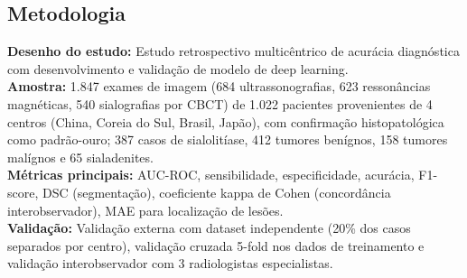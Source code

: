 \subsection{Metodologia}
\textbf{Desenho do estudo:} Estudo retrospectivo multicêntrico de acurácia
diagnóstica com desenvolvimento e validação de modelo de deep learning. \\
\textbf{Amostra:} 1.847 exames de imagem (684 ultrassonografias, 623
ressonâncias magnéticas, 540 sialografias por CBCT) de 1.022 pacientes
provenientes de 4 centros (China, Coreia do Sul, Brasil, Japão), com
confirmação histopatológica como padrão-ouro; 387 casos de sialolitíase,
412 tumores benígnos, 158 tumores malígnos e 65 sialadenites. \\
\textbf{Métricas principais:} AUC-ROC, sensibilidade, especificidade,
acurácia, F1-score, DSC (segmentação), coeficiente kappa de Cohen
(concordância interobservador), MAE para localização de lesões. \\
\textbf{Validação:} Validação externa com dataset independente
(20\% dos casos separados por centro), validação cruzada 5-fold nos
dados de treinamento e validação interobservador com 3 radiologistas
especialistas.

